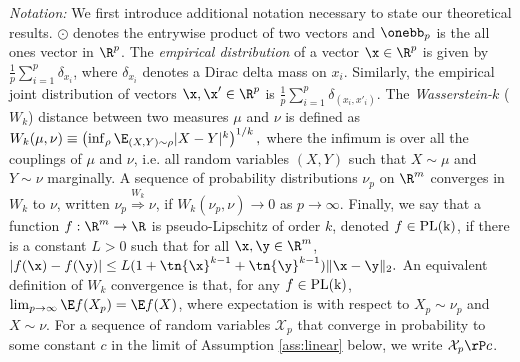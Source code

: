 \noindent\emph{Notation:}  We first introduce additional notation necessary to state our theoretical results. $\odot$ denotes the entrywise product of two vectors and $\onebb_p$ is the all ones vector in $\R^p$.
%
 The \emph{empirical distribution} of a vector $\x\in\R^p$ is given by 
$ \frac{1}{p}\sum_{i=1}^p \delta_{x_i}$, where $\delta_{x_i}$ denotes a Dirac delta mass on $x_i$. Similarly, the empirical joint distribution of vectors $\x, \x'\in \R^p$ is $\frac{1}{p} \sum_{i=1}^p \delta_{(x_i, x'_i)}$. The \emph{Wasserstein-$k$} ($W_k$) distance between two measures $\mu$ and $\nu$ is defined as 
%
%
$W_k(\mu,\nu) \equiv \left(\inf_{\rho}\E_{(X,Y)\sim \rho}|X-Y|^k\right)^{1/k},$ %
%
%
where the infimum is over all the couplings of $\mu$ and $\nu$, i.e. all random variables $(X,Y)$ such that $X\sim\mu$ and $Y\sim\nu$ marginally.
A sequence of probability distributions $\nu_p$ on $\R^m$ {converges in $W_k$} to 
$\nu$, written $\nu_p\stackrel{W_k}{\Longrightarrow} \nu$, if $W_k(\nu_p,\nu) \rightarrow 0$ as $p \rightarrow \infty$. Finally, we say that a function $f:\R^m\rightarrow\R$ is pseudo-Lipschitz of order $k$, denoted $f\in\rm{PL}(k)$, if there is a constant $L>0$ such that for all $\x,\y\in\R^m$,
$
|f(\x) - f(\y)|\leq L(1+\tn{\x}^{k-1}+\tn{\y}^{k-1})\|\x-\y\|_2.
$
An equivalent definition of $W_k$ convergence is that, for any $f\in\rm{PL}(k)$, $\lim_{p\rightarrow\infty}\E f(X_p)=\E f(X)$, where expectation is with respect to $X_p\sim\nu_p$ and $X\sim\nu$. For a sequence of random variables $\mathcal{X}_{p}$ that converge in probability to some constant $c$ in the limit of Assumption \ref{ass:linear} below, we  write $\mathcal{X}_{p}\rP c$. 


